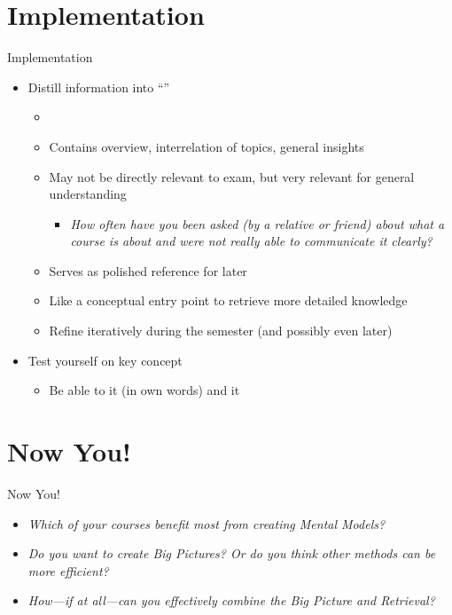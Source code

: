 \documentclass{ercisbeamer}
\begin{document}
\section{Implementation}
\begin{frame}{Implementation}
    \begin{tbox}
        \begin{itemize}
            \item Distill information into ``''
            \begin{itemize}
                \item {}
                \item Contains overview, interrelation of topics, general insights
                \item May not be directly relevant to exam, but very relevant for general understanding
                \begin{itemize}
                    \item \emph{How often have you been asked (by a relative or friend) about what a course is about and were not really able to communicate it clearly?}
                \end{itemize}
                \item Serves as polished reference for later
                \item Like a conceptual entry point to retrieve more detailed knowledge
                \item Refine iteratively during the semester (and possibly even later)
            \end{itemize}
            \item Test yourself on key concept
            \begin{itemize}
                \item Be able to  it (in own words) and  it
            \end{itemize}
        \end{itemize}
    \end{tbox}
\end{frame}
\setbgimage{}

\section{Now You!}
\begin{frame}{Now You!}
    \begin{itemize}
        \item \emph{Which of your courses benefit most from creating Mental Models?}
        \item \emph{Do you want to create Big Pictures? Or do you think other methods can be more efficient?}
        \item \emph{How---if at all---can you effectively combine the Big Picture and Retrieval?}
    \end{itemize}
\end{frame}
\end{document}
